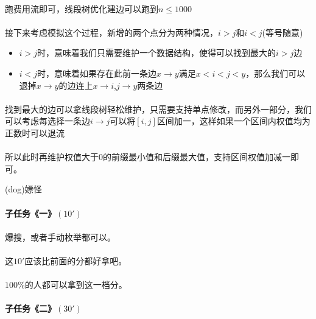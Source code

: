 \documentclass[UTF8]{ctexart}
\begin{document}
\paragraph{}跑费用流即可，线段树优化建边可以跑到$n\leq 1000$
\paragraph{}接下来考虑模拟这个过程，新增的两个点分为两种情况，$i>j$和$i<j$(等号随意)
\begin{itemize}
\item $i>j$时，意味着我们只需要维护一个数据结构，使得可以找到最大的$i>j$边
\item $i<j$时，意味着如果存在此前一条边$x\rightarrow y$满足$x<i<j<y$，那么我们可以退掉$x\rightarrow y$的边连上$x\rightarrow i$,$j\rightarrow y$两条边
\end{itemize}
\paragraph{}找到最大的边可以拿线段树轻松维护，只需要支持单点修改，而另外一部分，我们可以考虑每选择一条边$i\rightarrow j$可以将$[i,j]$区间加一，这样如果一个区间内权值均为正数时可以退流
\paragraph{}所以此时再维护权值大于0的前缀最小值和后缀最大值，支持区间权值加减一即可。

\clearpage
\begin{center}
	\large{(dog)嫖怪}
\end{center}
\paragraph{子任务《一》$(10')$}
\paragraph{}爆搜，或者手动枚举都可以。
\paragraph{}这$10'$应该比前面的分都好拿吧。
\paragraph{}$100\%$的人都可以拿到这一档分。
\paragraph{子任务《二》$(30')$}
\end{document}
